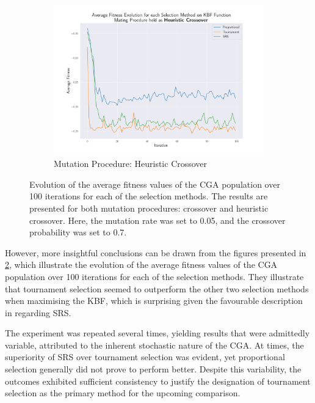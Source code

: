 \documentclass[10pt]{article}
\begin{document}
\begin{multicols}{2}
\begin{figure}[H]
\begin{subfigure}{0.46\textwidth}
        \includegraphics[width=\textwidth]{../figures/Permanent Images/Fitness_Evolution_Heuristic Crossover.png}
        \caption{Mutation Procedure: Heuristic Crossover}
        \label{fig:CGA_fitness_evo_Heuristic Crossover}
    \end{subfigure}
    \captionsetup{justification=centering}
    \caption{Evolution of the average fitness values of the CGA population over 100 iterations for each of the selection methods. The results are presented for both mutation procedures: crossover and heuristic crossover. Here, the mutation rate was set to 0.05, and the crossover probability was set to 0.7.}
    \label{fig:CGA_fitness_evo}
\end{figure}
\vspace{-1mm}
However, more insightful conclusions can be drawn from the figures presented in \ref{fig:CGA_fitness_evo}, which illustrate the evolution of the average fitness values of the CGA population over 100 iterations for each of the selection methods. They illustrate that tournament selection seemed to outperform the other two selection methods when maximising the KBF, which is surprising given the favourable description in \cite{parks2023geneticalgorithms} regarding SRS. 

The experiment was repeated several times, yielding results that were admittedly variable, attributed to the inherent stochastic nature of the CGA. At times, the superiority of SRS over tournament selection was evident, yet proportional selection generally did not prove to perform better. Despite this variability, the outcomes exhibited sufficient consistency to justify the designation of tournament selection as the primary method for the upcoming comparison.


\end{multicols}
\end{document}
